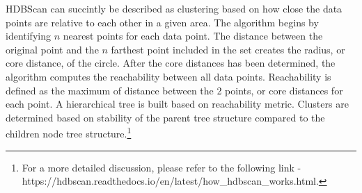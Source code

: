 \documentclass{article}
\begin{document}
HDBScan can succintly be described as clustering based on how close the data points are relative to each other in a given area. The algorithm begins by identifying $n$ nearest points for each data point. The distance between the original point and the $n$ farthest point included in the set creates the radius, or core distance, of the circle. After the core distances has been determined, the algorithm computes the reachability between all data points. Reachability is defined as the maximum of distance between the 2 points, or core distances for each point. A hierarchical tree is built based on reachability metric. Clusters are determined based on stability of the parent tree structure compared to the children node tree structure.\footnote{For a more detailed discussion, please refer to the following link -  https://hdbscan.readthedocs.io/en/latest/how\_hdbscan\_works.html.}
\end{document}
